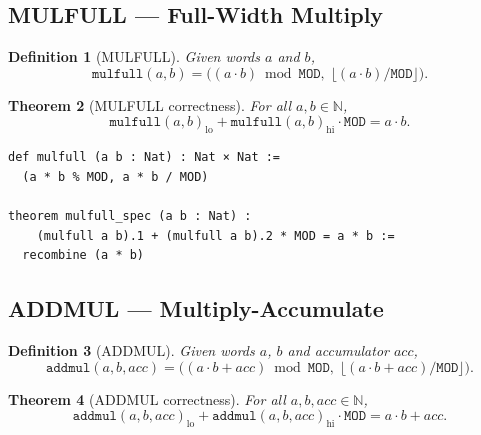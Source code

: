 \documentclass[11pt,a4paper]{article}
\newtheorem{theorem}{Theorem}[section]
\newtheorem{definition}[theorem]{Definition}
\begin{document}
\subsection{MULFULL --- Full-Width Multiply}

\begin{definition}[MULFULL]
Given words $a$ and $b$,
\[
  \mathtt{mulfull}(a, b) = \bigl((a \cdot b) \bmod \mathtt{MOD},\;
  \lfloor(a \cdot b) / \mathtt{MOD}\rfloor\bigr).
\]
\end{definition}

\begin{theorem}[MULFULL correctness]
\label{thm:mulfull}
For all $a, b \in \mathbb{N}$,
\[
  \mathtt{mulfull}(a,b)_{\mathrm{lo}}
  + \mathtt{mulfull}(a,b)_{\mathrm{hi}} \cdot \mathtt{MOD}
  = a \cdot b.
\]
\end{theorem}

\begin{lstlisting}[style=lean,caption={MULFULL definition and correctness}]
def mulfull (a b : Nat) : Nat × Nat :=
  (a * b % MOD, a * b / MOD)

theorem mulfull_spec (a b : Nat) :
    (mulfull a b).1 + (mulfull a b).2 * MOD = a * b :=
  recombine (a * b)
\end{lstlisting}

\subsection{ADDMUL --- Multiply-Accumulate}

\begin{definition}[ADDMUL]
Given words $a$, $b$ and accumulator $\mathit{acc}$,
\[
  \mathtt{addmul}(a, b, \mathit{acc}) =
  \bigl((a \cdot b + \mathit{acc}) \bmod \mathtt{MOD},\;
  \lfloor(a \cdot b + \mathit{acc}) / \mathtt{MOD}\rfloor\bigr).
\]
\end{definition}

\begin{theorem}[ADDMUL correctness]
\label{thm:addmul}
For all $a, b, \mathit{acc} \in \mathbb{N}$,
\[
  \mathtt{addmul}(a,b,\mathit{acc})_{\mathrm{lo}}
  + \mathtt{addmul}(a,b,\mathit{acc})_{\mathrm{hi}} \cdot \mathtt{MOD}
  = a \cdot b + \mathit{acc}.
\]
\end{theorem}
\end{document}
